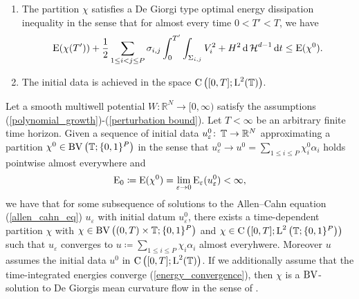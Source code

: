 \begin{definition}
\begin{enumerate}
		\item 
		The partition $ \chi $ satisfies a De Giorgi type optimal energy 
		dissipation inequality in the sense that for almost every time $ 0 < T' 
		< T $, we have
		\begin{equation*}
			\operatorname{E} ( \chi ( T' ) )
			+
			\frac{ 1 }{ 2 }
			\sum_{ 1 \leq i < j \leq P }
				\sigma_{ i , j }
				\int_{ 0 }^{ T' }
					\int_{ \Sigma_{ i , j } }
						V_{ i }^{ 2 }
						+
						H^{ 2 }
					\dd{ \operatorname{\mathcal{H}}^{ d - 1 } }
				\dd{ t }
			\leq
			\operatorname{E} ( \chi^{ 0 } ).
		\end{equation*}
		
		\item
		The initial data is achieved in the space $ \operatorname{C} \left( [ 0 , T ] ; 
		\operatorname{L}^{ 2 } ( \operatorname{\mathbb{T}} ) \right) $.
	\end{enumerate}
\end{definition}

\begin{theorem}
	\label{convergence_to_de_giorgis_multiphase_mcf}
	Let a smooth multiwell potential $ W \colon \mathbb{ R }^{ N } \to [ 0, 
	\infty ) $ satisfy the assumptions 
	(\ref{polynomial_growth})-(\ref{perturbation bound}). Let $ T < \infty 
	$ be an arbitrary finite time horizon. Given a sequence of initial data 
	$ u_{ \varepsilon }^{ 0 } \colon \operatorname{\mathbb{T}} \to \mathbb{ R }^{ N } $ 
	approximating a partition 
	$ \chi^{ 0 } \in \operatorname{BV} \left( \operatorname{\mathbb{T}} ; \{ 0 , 1 \}^{ P } \right) $ 
	in the sense that 
	$ u_{ \varepsilon }^{ 0 } \to u^{ 0 } =  \sum_{ 1 \leq i \leq P } 
	\chi_{ i }^{ 0 } \alpha_{ i } $ 
	holds pointwise almost everywhere and 
	\begin{equation*} 
		\operatorname{E}_{ 0 } 
		\coloneqq 
		\operatorname{E} ( \chi^{ 0 } ) 
		= 
		\lim_{ \varepsilon \to 0 } 
		\operatorname{E}_{ \varepsilon } ( u_{ \varepsilon }^{ 0 } ) 
		< 
		\infty,
	\end{equation*}
	we have that for 
	some subsequence of solutions to the Allen--Cahn equation
	(\ref{allen_cahn_eq}) $ u_{\varepsilon } $ with initial datum $ u_{ 
		\varepsilon }^{ 0 } $, there exists a time-dependent partition $ \chi $ 
	with 
	$ \chi \in \operatorname{BV} \left( ( 0 , T ) \times \operatorname{\mathbb{T}} ; \{ 0 , 1 \}^{ P } 
	\right) $ and
	$ \chi 
	\in \operatorname{C} \left( [ 0 , T ] ; \operatorname{L}^{ 2 } \left( \operatorname{\mathbb{T}} ;  \{ 0 , 1 
	\}^{ P } \right) \right) $ such that $ u_{ \varepsilon } $ converges to 
	$ u \coloneqq \sum_{ 1 \leq i \leq P } \chi_{ i } \alpha_{ i } $ almost 
	everyhwere. Moreover $ u $ assumes the initial data $ u^{ 0 } $ in $ 
	\operatorname{C} \left( [ 0, T ] ; \operatorname{L}^{ 2 }( \operatorname{\mathbb{T}} ) \right) $. If we 
	additionally assume that the 
	time-integrated energies converge (\ref{energy_convergence}), then $ 
	\chi $ is a $ \operatorname{BV} $-solution to De Giorgis mean curvature flow in the sense 
	of 
	.
\end{theorem} 

